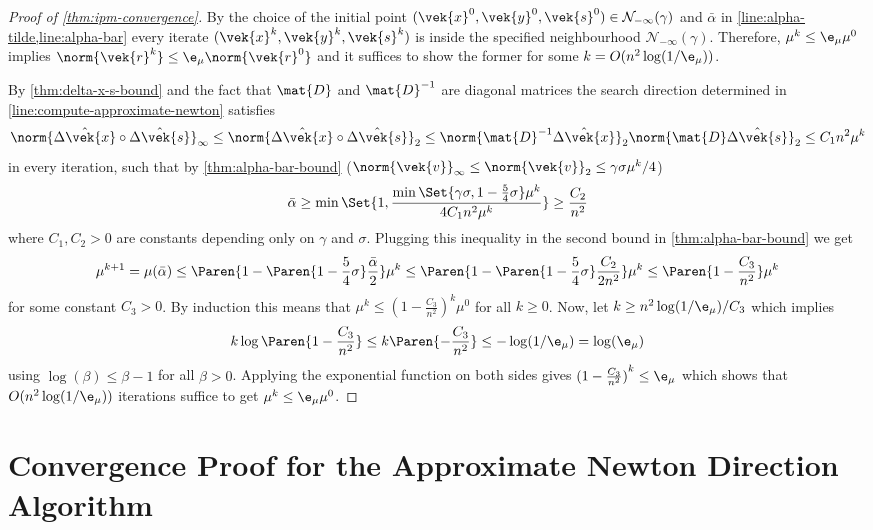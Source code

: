 \begin{proof}[Proof of \cref{thm:ipm-convergence}]
  By the choice of the initial point \((\vek{x}^0, \vek{y}^0, \vek{s}^0) \in \mathcal{N}_{-\infty}(\gamma)\) and \(\bar{\alpha}\) in \cref{line:alpha-tilde,line:alpha-bar} every iterate \((\vek{x}^k, \vek{y}^k, \vek{s}^k)\) is inside the specified neighbourhood \(\mathcal{N}_{-\infty}(\gamma)\).
  Therefore, \(\mu^k \leq \e_\mu \mu^0\) implies \(\norm{\vek{r}^k} \leq \e_\mu \norm{\vek{r}^0}\) and it suffices to show the former for some \(k = O(n^2 \log(1/\e_\mu))\).

  By \cref{thm:delta-x-s-bound} and the fact that \(\mat{D}\) and \(\mat{D}^{-1}\) are diagonal matrices the search direction determined in \cref{line:compute-approximate-newton} satisfies
  \[ \norm{\hat{\Delta\vek{x}} \circ \hat{\Delta\vek{s}}}_\infty \leq \norm{\hat{\Delta\vek{x}} \circ \hat{\Delta\vek{s}}}_2 \leq \norm{\mat{D}^{-1}\hat{\Delta\vek{x}}}_2 \norm{\mat{D}\hat{\Delta\vek{s}}}_2 \leq C_1 n^2 \mu^k\]
  in every iteration, such that by \cref{thm:alpha-bar-bound} (\(\norm{\vek{v}}_\infty \leq \norm{\vek{v}}_2 \leq \gamma \sigma \mu^k/4\))
  \[ \bar{\alpha} \geq \min \Set{1, \frac{\min \Set{\gamma \sigma, 1 - \frac{5}{4}\sigma} \mu^k}{4 C_1 n^2 \mu^k}} \geq \frac{C_2}{n^2} \]
  where \(C_1, C_2 > 0\) are constants depending only on \(\gamma\) and \(\sigma\).
  Plugging this inequality in the second bound in \cref{thm:alpha-bar-bound} we get
  \[ \mu^{k+1} = \mu(\bar{\alpha}) \leq \Paren{ 1 - \Paren{1 - \frac{5}{4} \sigma} \frac{\bar{\alpha}}{2}} \mu^k \leq \Paren{ 1 - \Paren{1 - \frac{5}{4} \sigma} \frac{C_2}{2 n^2}} \mu^k \leq \Paren{1 - \frac{C_3}{n^2}} \mu^k \]
  for some constant \(C_3 > 0\).
  By induction this means that \(\mu^k \leq {(1 - \frac{C_3}{n^2})}^k \mu^0\) for all \(k \geq 0\).
  Now, let \(k \geq n^2 \log(1/\e_\mu) / C_3\) which implies
  \[ k \log\Paren{1 - \frac{C_3}{n^2}} \leq k \Paren{- \frac{C_3}{n^2}} \leq -\log(1/\e_\mu) = \log(\e_\mu) \]
  using \(\log(\beta) \leq \beta-1\) for all \(\beta > 0\).
  Applying the exponential function on both sides gives \({(1 - \frac{C_3}{n^2})}^k \leq \e_\mu\) which shows that \(O(n^2 \log(1/\e_\mu))\) iterations suffice to get \(\mu^k \leq \e_\mu \mu^0\).
\end{proof}

\section{Convergence Proof for the Approximate Newton Direction Algorithm}

